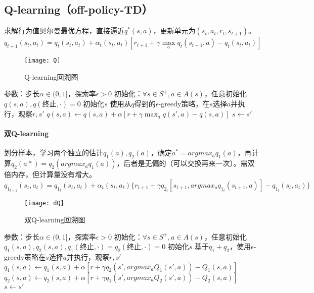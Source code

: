 \documentclass[
12pt, %
a4paper, 
oneside, %
headinclude,footinclude, %
]{scrartcl}
\begin{document}
\subsection[Q-learning]{Q-learning（off-policy-TD）}
求解行为值贝尔曼最优方程，直接逼近$ q^*(s, a) $，更新单元为$ (s_t, a_t, r_t, s_{t + 1}) $。
$$ q_{t + 1}(s_t, a_t) = q_t(s_t, a_t) + \alpha_t(s_t, a_t)[r_{t + 1} + \gamma \max_a q_t(s_{t + 1}, a) - q_t(s_t, a_t)] $$

\begin{figure}[H]
\centering
\texttt{[image: Q]}
\caption{Q-learning回溯图}
\end{figure}
\begin{myalgorithm}
\State 参数：步长$ \alpha \in (0,1] $，探索率$ \epsilon > 0 $
\State 初始化：$ \forall s \in S^+, a \in A(s) $，任意初始化$ q(s,a), q(\text{终止}, \cdot) = 0 $
\State 初始化$ s $
\State 使用从$ q $得到的$ \epsilon $-greedy策略，在$ s $选择$ a $并执行，观察$ r, s' $
\State $ q(s, a) \gets q(s, a) + \alpha [r + \gamma \max_a q(s', a) - q(s, a)] $
\State $ s \gets s' $
\EndWhile
\EndFor
\end{myalgorithm}
\paragraph{双Q-learning}
划分样本，学习两个独立的估计$ q_1(a), q_2(a) $，确定$ a^* = argmax_a q_1(a) $，再计算$ q_2(a*) = q_2(argmax_a q_1(a)) $，后者是无偏的（可以交换再来一次）。需双倍内存，但计算量没有增大。
$$ q_{1_{t + 1}}(s_t, a_t) = q_{1_t}(s_t, a_t) + \alpha_t(s_t, a_t)\{r_{t + 1} + \gamma q_{2_t}[s_{t + 1}, argmax_a q_{1_t}(s_{t + 1}, a)] - q_{1_t}(s_t, a_t)\} $$

\begin{figure}[H]
\centering
\texttt{[image: dQ]}
\caption{双Q-learning回溯图}
\end{figure}
\begin{myalgorithm}[双Q-learning]
\State 参数：步长$ \alpha \in (0,1] $，探索率$ \epsilon > 0 $
\State 初始化：$ \forall s \in S^+, a \in A(s) $，任意初始化$ q_1(s,a), q_2(s,a), q_1(\text{终止}, \cdot) = q_2(\text{终止}, \cdot) = 0 $
\State 初始化$ s $
\State 基于$ q_1 + q_2 $，使用$ \epsilon $-greedy策略在$ s $选择$ a $并执行，观察$ r, s' $
\State $ q_1(s, a) \gets q_1(s, a) + \alpha [r + \gamma q_2(s', argmax_a Q_1(s',a)) - Q_1(s, a)] $
\Else
\State $ q_2(s, a) \gets q_2(s, a) + \alpha [r + \gamma q_1(s', argmax_a Q_2(s',a)) - Q_2(s, a)] $
\EndIf
\State $ s \gets s' $
\EndWhile
\EndFor
\end{myalgorithm}
\end{document}
